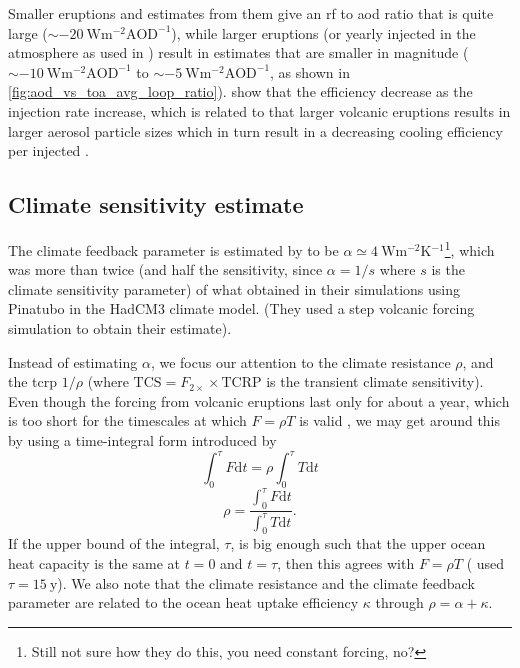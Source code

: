 \documentclass{ametsocV5}
\newcommand{\iso}[1][i]{{#1}njected \ce{SO2}}
\begin{document}
Smaller eruptions and estimates from them give an \ac{rf} to \ac{aod} ratio that is
quite large (\(\sim \SI{-20}{\watt\metre^{-2}\mathrm{AOD}^{-1}}\)), while larger
eruptions (or yearly \iso{} in the atmosphere as used in \citet{niemeier2015}) result in
estimates that are smaller in magnitude (\(\sim
\SI{-10}{\watt\metre^{-2}\mathrm{AOD}^{-1}}\) to \(\sim
\SI{-5}{\watt\metre^{-2}\mathrm{AOD}^{-1}}\), as shown in
\cref{fig:aod_vs_toa_avg_loop_ratio}). \citet{niemeier2017} show that the efficiency
decrease as the injection rate increase, which is related to
that larger volcanic eruptions results in larger aerosol particle sizes which in turn
result in a decreasing cooling efficiency per \iso{} \citep{english2013, timmreck2018}.

\subsection{Climate sensitivity estimate}


The climate feedback parameter is estimated by \citet{jones2005} to be \(\alpha \simeq
\SI{4}{\watt\metre^{-2}\kelvin^{-1}}\)\footnote{Still not sure how they do this, you
  need constant forcing, no?}, which was more than twice (and half the sensitivity, since
\(\alpha =1/s\) where \(s\) is the climate sensitivity parameter) of what
\citet{gregory2016} obtained in their simulations using Pinatubo in the HadCM3 climate
model. (They used a step volcanic forcing simulation to obtain their estimate).

Instead of estimating \(\alpha \), we focus our attention to the climate resistance
\(\rho \), and the \ac{tcrp} \(1/\rho\) (where \(\mathrm{TCS}=F_{2\times}\times
\mathrm{TCRP}\) is the transient climate sensitivity). Even though the forcing from
volcanic eruptions last only for about a year, which is too short for the timescales at
which \(F=\rho T\) is valid \citep{gregory2016}, we may get around this by using a
time-integral form introduced by \citet{merlis2014}
\begin{equation}
  \int_0^{\tau}F \mathrm{d}t=\rho\int_{0}^{\tau}T \mathrm{d}t
\end{equation}
\begin{equation}
  \rho=\frac{\int_0^{\tau}F \mathrm{d}t}{\int_{0}^{\tau}T \mathrm{d}t}.
  \label{eq:climate-resistance}
\end{equation}
%
If the upper bound of the integral, \(\tau \), is big enough such that the upper ocean
heat capacity is the same at \(t=0\) and \(t=\tau \), then this agrees with \(F=\rho T\)
\citep{gregory2016} (\citet{merlis2014} used \(\tau =\SI{15}{\mathrm{y}}\)). We also
note that the climate resistance and the climate feedback parameter are related to the
ocean heat uptake efficiency \(\kappa \) through \(\rho =\alpha +\kappa \).
\end{document}
